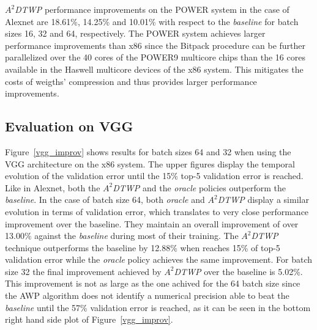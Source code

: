 \textit{$A^2$DTWP} performance improvements on the POWER system in the case of 
Alexnet are 18.61\%, 14.25\% and 10.01\% with respect to the \textit{baseline} 
for batch sizes 16, 32 and 64, respectively.  The POWER system achieves larger 
performance improvements than x86 since the Bitpack procedure can be further 
parallelized over the 40 cores of the POWER9 multicore chips than the 16 cores 
available in the Haswell multicore devices of the x86 system.  This mitigates 
the costs of weigths' compression and thus provides larger performance 
improvements. 

\subsection{Evaluation on VGG}
\label{sec:VGG}

Figure~\ref{vgg_improv} shows results for batch sizes 64 and 32 when using the 
VGG architecture on the x86 system.  The upper figures display the temporal 
evolution of the validation error until the 15\% top-5 validation error is 
reached.
Like in Alexnet, both the \textit{$A^2$DTWP} and the \textit{oracle} policies 
outperform the \textit{baseline}.
In the case of batch size 64, both \textit{oracle} and \textit{$A^2$DTWP} 
display a similar evolution in terms of validation error, which translates to 
very close performance improvement over the baseline.  They maintain an overall 
improvement of over 13.00\% against the \textit{baseline} during most of their 
training. The \textit{$A^2$DTWP} technique outperforms the baseline by 12.88\% 
when reaches 15\% of top-5 validation error while the \textit{oracle} policy 
achieves the same improvement.
For batch size 32 the final improvement achieved by \textit{$A^2$DTWP} over the 
baseline is 5.02\%.
This improvement is not as large as the one achived for the 64 batch size since 
the AWP algorithm does not identify a numerical precision able to beat the 
\textit{baseline} until the 57\% validation error is reached, as it can be seen 
in the bottom right hand side plot of Figure~\ref{vgg_improv}. 

